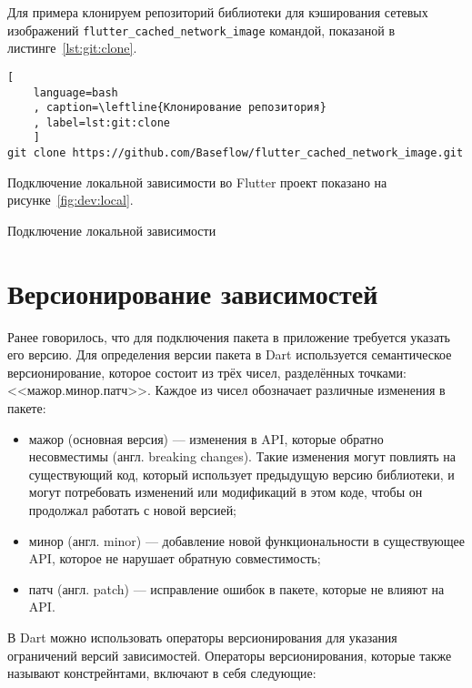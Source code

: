 Для примера клонируем репозиторий библиотеки
для кэширования сетевых изображений
\texttt{flutter\_cached\_network\_image}
командой, показаной в листинге~\ref{lst:git:clone}.

\begin{lstlisting}[
	language=bash
	, caption=\leftline{Клонирование репозитория}
	, label=lst:git:clone
	]
git clone https://github.com/Baseflow/flutter_cached_network_image.git
\end{lstlisting}

Подключение локальной зависимости во Flutter проект
показано на рисунке~\ref{fig:dev:local}.

\begin{image}
	\caption{Подключение локальной зависимости}
	\label{fig:dev:local}
\end{image}

\section{Версионирование зависимостей}

Ранее говорилось, что для подключения пакета
в приложение требуется указать его версию.
Для определения версии пакета в Dart используется семантическое
версионирование, которое состоит из трёх чисел,
разделённых точками: <<мажор.минор.патч>>.
Каждое из чисел обозначает различные изменения в пакете:

\begin{itemize}
	\item мажор (основная версия) --- изменения в API,
		которые обратно несовместимы (англ. breaking changes).
		Такие изменения могут повлиять на существующий код,
		который использует предыдущую версию библиотеки,
		и могут потребовать изменений или модификаций в этом коде,
		чтобы он продолжал работать с новой версией;
	\item минор (англ. minor) --- добавление новой функциональности
		в существующее API, которое не нарушает обратную совместимость;
	\item патч (англ. patch) --- исправление ошибок в пакете,
		которые не влияют на API.
\end{itemize}

В Dart можно использовать операторы версионирования
для указания ограничений версий зависимостей.
Операторы версионирования, которые также называют констрейнтами,
включают в себя следующие:

